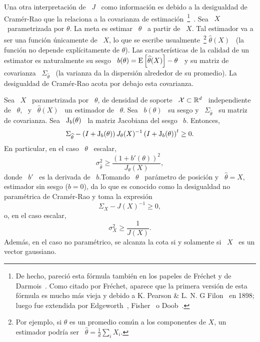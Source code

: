 Una  otra  interpretaci\'on  de \  $J$  \  como  informaci\'on  es debido  a  la
desigualdad   de   Cram\'er-Rao   que   la   relaciona  a   la   covarianza   de
estimaci\'on~\footnote{De hecho, pareci\'o esta f\'ormula tambi\'en en los papeles
  de  Fr\'echet y  de Darmois~\cite{Fre43,  Dar45}. Como  citado  por Fr\'echet,
  aparece que la primera versi\'on de esta f\'ormula es mucho m\'as vieja y debido
  a K.  Pearson  \& L. N.  G Filon~\cite{PeaFil98} en  1898; luego fue extendida
  por          Edgeworth~\cite{Edg08},          Fisher~\cite{Fis25:07}         o
  Doob~\cite{Doo36}.}~\cite{Rao45,  Rao92,  RaoWis47,  Cra46,  Rio07,  CovTho06,
  Fri04, Kay93,  Bos07}.  Sea \  $X$ \ parametrizada  por $\theta$.  La  meta es
estimar \ $\theta$  \ a partir de \  $X$.  Tal estimador va a  ser una funci\'on
\'unicamente de  \ $X$, lo  que se escribe usualmente~\footnote{Por  ejemplo, si
  $\theta$  es  un promedio  com\'un  a los  componentes  de  $X$, un  estimador
  podr\'ia    ser    \     $\widehat{\theta}    =    \frac1d    \sum_i    X_i$.}
$\widehat{\theta}(X)$ \ (la funci\'on  no depende expl\'icitamente de $\theta$).
Las caracter\'isticas de  la calidad de un estimator es  naturalmente su sesgo \
$b(\theta) = \operatorname{E}\left[  \widehat{\theta}(X) \right] - \theta$ \  y su matriz de
covarianza  \  $\Sigma_{\widehat{\theta}}$ \  (la  varianza  da la  dispersi\'on
alrededor de su promedio).  La desigualdad de Cram\'er-Rao acota por debajo esta
covarianza.
%
\begin{teorema}
\label{Teo:SZ:CramerRao}
%
  Sea  \ $X$  \  parametrizada por  \ $\theta$,  de  densidad de  soporte \  $\mathcal{X}
  \subset \mathbb{R}^d$ \ independiente de  \ $\theta$, \ y \ $\widehat{\theta}(X)$
  \  un  estimador   de  \  $\theta$.   Sea  \  $b(\theta)$  \   su  sesgo  y  \
  $\Sigma_{\widehat{\theta}}$ \ su matriz de covarianza.  Sea \ $\operatorname{J}_b(\theta)$
  \ la matriz Jacobiana del sesgo \ $b$.  Entonces,
  \[
  \Sigma_{\widehat{\theta}} - \left( I + \operatorname{J}_b(\theta) \right) J_\theta(X)^{-1}
  \left( I + \operatorname{J}_b(\theta) \right)^t \ge 0.
  \]
  En particular, en el caso \ $\theta$ \ escalar,
  \[
  \sigma_{\widehat{\theta}}^2 \ge \frac{(1+b'(\theta))^2}{J_\theta(X)},
  \]
  donde  \  $b'$ \  es  la  derivada de  \  $b$.\newline  Tomando  \ $\theta$  \
  par\'ametro de posici\'on y \  $\widehat{\theta} = X$, estimador sin sesgo ($b
  =  0$),  da  lo que  es  conocido  como  la  desigualdad no  param\'etrica  de
  Cram\'er-Rao y toma la expresi\'on
  \[
  \Sigma_X - J(X)^{-1} \ge 0,
  \]
  o, en el caso escalar,
  \[
  \sigma_X^2 \ge \frac{1}{J(X)}.
  \]
  Adem\'as, en el caso no param\'etrico, se  alcanza la cota si y solamente si \
  $X$ \ es un vector gaussiano.
\end{teorema}
